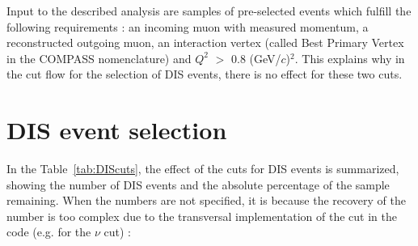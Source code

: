Input to the described analysis are samples of pre-selected events which fulfill the following requirements : an incoming muon with measured momentum, a reconstructed outgoing muon, an interaction vertex (called Best Primary Vertex in the COMPASS nomenclature) and $Q^2$ $>$ $0.8$ (GeV/$c$)$^2$. This explains why in the cut flow for the selection of DIS events, there is no effect for these two cuts.


\section{DIS event selection}

In the Table~\ref{tab:DIScuts}, the effect of the cuts for DIS events is summarized, showing the number of DIS events and the absolute percentage of the sample remaining. When the numbers are not specified, it is because the recovery of the number is too complex due to the transversal implementation of the cut in the code (e.g. for the $\nu$ cut) :

\newpage

